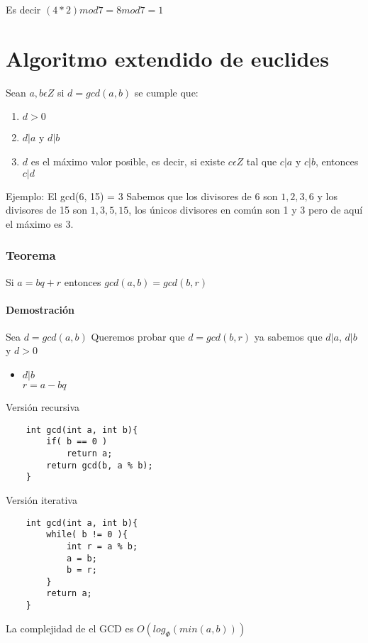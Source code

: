 Es decir $(4 * 2) mod 7 = 8 mod 7 = 1$ \newline



\section{Algoritmo extendido de euclides}

Sean $a,b \epsilon Z$ si $d = gcd(a, b)$ se cumple que:
\begin{enumerate}
    \item $d > 0$
    \item $d|a$ y $d|b$
    \item $d$ es el máximo valor posible, es decir, si existe $c \epsilon Z$ tal que $c|a$ y $c|b$, entonces $c|d$
\end{enumerate}

Ejemplo: \newline
El gcd(6, 15) = 3 \newline
Sabemos que los divisores de 6 son ${1, 2, 3, 6}$ y los divisores de 15 son ${1, 3, 5, 15}$, los únicos divisores en común son 1 y 3 pero de aquí el máximo es 3.

\subsubsection{Teorema}
Si $a = bq + r$ entonces $gcd(a, b) = gcd(b, r)$ \newline
\paragraph{Demostración} \newline
Sea $d = gcd(a, b)$ Queremos probar que $d = gcd(b, r)$ ya sabemos que $d|a$, $d|b$ y $d > 0$ \newline
\begin{itemize}
    \item {$d|b$ \\ $r = a - bq$ }
\end{itemize}

Versión recursiva
\begin{lstlisting}
    int gcd(int a, int b){
        if( b == 0 )
            return a;
        return gcd(b, a % b);
    }
\end{lstlisting}

Versión iterativa 
\begin{lstlisting}
    int gcd(int a, int b){
        while( b != 0 ){
            int r = a % b;
            a = b;
            b = r;
        }
        return a;
    }
\end{lstlisting}

La complejidad de el GCD es $O(log_{\Phi}( min(a, b) ) )$ 